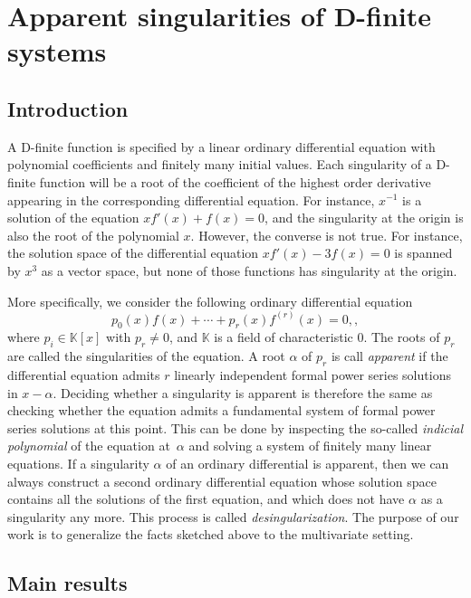 \documentclass[10pt,a4paper]{article}
\newcommand{\bK}{ {\mathbb  K}}
\begin{document}
\section{Apparent singularities of D-finite systems} \label{SECT:apparent}

\subsection{Introduction}

A D-finite function is specified by a linear ordinary differential equation with polynomial 
coefficients and finitely many initial values. Each singularity of a D-finite function 
will be a root of the coefficient of the highest order derivative appearing 
in the corresponding differential equation. 
For instance, $x^{-1}$ is a solution of the equation $x f'(x) + f(x) = 0$, 
and the singularity at the origin is also the root of the polynomial $x$. 
However, the converse is not true. For instance, the solution space of 
the differential equation $x f'(x) - 3 f(x) = 0$ is spanned by $x^3$ as a vector space, 
but none of those functions has singularity at the origin.

More specifically, we consider the following ordinary differential equation 
$$p_0(x)f(x) + \cdots + p_r(x)f^{(r)}(x) = 0,,$$ 
where $p_i \in \bK[x]$ with $p_r\neq0$, and $\bK$ is a field of characteristic $0$.  
The roots of $p_r$ are called the
singularities of the equation. A root $\alpha$ of $p_r$ is call \emph{apparent} if the
differential equation admits $r$ linearly independent formal power series solutions in 
$x - \alpha$. Deciding whether a singularity is apparent is therefore the same as
checking whether the equation admits a fundamental system of formal power series
solutions at this point. This can be done by inspecting the so-called
\emph{indicial polynomial} of the equation at~$\alpha$ and solving a system of finitely many linear equations. 
If a singularity $\alpha$ of an ordinary differential is apparent, then we can always 
construct a second ordinary differential equation whose solution space contains all the solutions of the
first equation, and which does not have $\alpha$ as a singularity any more. 
This process is called \emph{desingularization}. The purpose of our work is to generalize the facts sketched above to
the multivariate setting.

\subsection{Main results}
\end{document}
